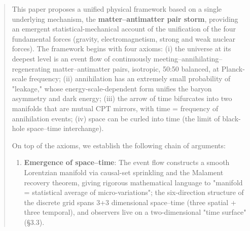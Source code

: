 \documentclass[12pt]{article}
\begin{document}
\begin{abstract}

This paper proposes a unified physical framework based on a single underlying mechanism, the \textbf{matter--antimatter pair storm}, providing an emergent statistical-mechanical account of the unification of the four fundamental forces (gravity, electromagnetism, strong and weak nuclear forces). The framework begins with four axioms: (i) the universe at its deepest level is an event flow of continuously meeting--annihilating--regenerating matter--antimatter pairs, isotropic, 50:50 balanced, at Planck-scale frequency; (ii) annihilation has an extremely small probability of "leakage," whose energy-scale-dependent form unifies the baryon asymmetry and dark energy; (iii) the arrow of time bifurcates into two manifolds that are mutual CPT mirrors, with time = frequency of annihilation events; (iv) space can be curled into time (the limit of black-hole space--time interchange).

On top of the axioms, we establish the following chain of arguments:

\begin{enumerate}
\item \textbf{Emergence of space--time}: The event flow constructs a smooth Lorentzian manifold via causal-set sprinkling and the Malament recovery theorem, giving rigorous mathematical language to "manifold = statistical average of micro-variations"; the six-direction structure of the discrete grid spans 3+3 dimensional space--time (three spatial + three temporal), and observers live on a two-dimensional "time surface" (\S{}3.3).
\end{enumerate}


\end{abstract}
\end{document}
